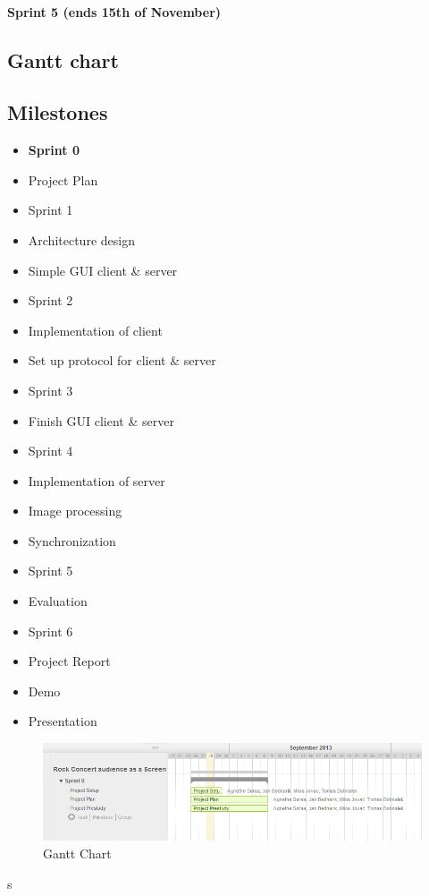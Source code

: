 \documentclass{article}
\begin{document}
\paragraph{Sprint 5 (ends 15th of November)}
\subsection{Gantt chart}

\subsection{Milestones}

\begin{itemize}
    \item \textbf{Sprint 0}
    \item Project Plan
    \item Sprint 1
    \item Architecture design
    \item Simple GUI client \& server
    \item Sprint 2
    \item Implementation of client
    \item Set up protocol for client \& server
    \item Sprint 3
    \item Finish GUI client \& server
    \item Sprint 4
    \item Implementation of server
        \item Image processing
        \item Synchronization
    \item Sprint 5
    \item Evaluation
    \item Sprint 6
    \item Project Report
    \item Demo
    \item Presentation
\end{itemize}

\begin{figure}[ht]
\begin{center}
    \includegraphics[scale=0.6]{images/gantt}
    \caption{Gantt Chart}
    \label{img:gantt}
\end{center}
\end{figure}
s
\end{document}

